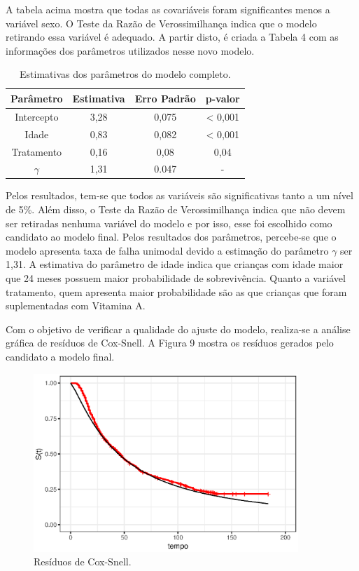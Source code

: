 \documentclass[a4paper,12pt]{article}
\begin{document}
A tabela acima mostra que todas as covariáveis foram significantes menos a variável sexo. O Teste da Razão de Verossimilhança indica que o modelo retirando essa variável é adequado. A partir disto, é criada a Tabela 4 com as informações dos parâmetros utilizados nesse novo modelo.

\begin{table}[H]
\centering
\caption{Estimativas dos parâmetros do modelo completo.}
\begin{tabular}{c|ccc}
\hline
Parâmetro & Estimativa & Erro Padrão & p-valor \\
\hline
Intercepto & 3,28 & 0,075 & < 0,001 \\

Idade & 0,83 & 0,082 & < 0,001 \\

Tratamento & 0,16 & 0,08 & 0,04 \\

$\gamma$ & 1,31 & 0.047 & - \\
\hline
\end{tabular}
\end{table}

Pelos resultados, tem-se que todos as variáveis são significativas tanto a um nível de 5\%. Além disso, o Teste da Razão de Verossimilhança indica que não devem ser retiradas nenhuma variável do modelo e por isso, esse foi escolhido como candidato ao modelo final. Pelos resultados dos parâmetros, percebe-se que o modelo apresenta taxa de falha unimodal devido a estimação do parâmetro $\gamma$ ser 1,31. A estimativa do parâmetro de idade indica que crianças com idade maior que 24 meses possuem maior probabilidade de sobrevivência. Quanto a variável tratamento, quem apresenta maior probabilidade são as que crianças que foram suplementadas com Vitamina A.

Com o objetivo de verificar a qualidade do ajuste do modelo, realiza-se a análise gráfica de resíduos de Cox-Snell. A Figura 9 mostra os resíduos gerados pelo candidato a modelo final.

\begin{figure}[H] \label{fig:surv_vit}
  \begin{center}
    \includegraphics[width=10cm]{mod_vazio_vit}
    \caption{Resíduos de Cox-Snell.}
  \end{center}
\end{figure}
\end{document}
